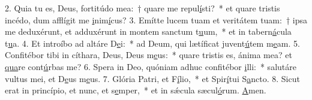 2. Quia tu es, Deus, fortitúdo mea:~† quare me repul\uline{í}sti?~* et quare tristis incédo, dum afflígit me \uline{i}nim\uline{í}cus?
3. Emítte lucem tuam et veritátem tuam:~† ipsa me deduxérunt, et adduxérunt in montem sanctum t\uline{u}um,~* et in tabern\uline{á}cula t\uline{u}a.
4. Et introíbo ad altáre D\uline{e}i:~* ad Deum, qui lætíficat juvent\uline{ú}tem m\uline{e}am.
5. Confitébor tibi in cíthara, Deus, Deus m\uline{e}us:~* quare tristis es, ánima mea? et \uline{qua}re cont\uline{ú}rbas me?
6. Spera in Deo, quóniam adhuc confitébor \uline{i}lli:~* salutáre vultus mei, et D\uline{e}us m\uline{e}us.
7. Glória Patri, et F\uline{í}lio,~* et Spir\uline{í}tui S\uline{a}ncto.
8. Sicut erat in princípio, et nunc, et s\uline{e}mper,~* et in sǽcula sæcul\uline{ó}rum. \uline{A}men.
